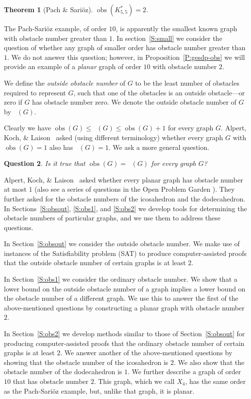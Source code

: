 \documentclass[12pt]{amsart}
\newtheorem{theorem}{Theorem}[section]
\newtheorem{question}[theorem]{Question}
\theoremstyle{remark}
\DeclareMathOperator{\obs}{\ensuremath{\mathrm{obs}}}
\DeclareMathOperator{\obsout}{\ensuremath{\obs_\mathrm{out}}}
\begin{document}
\begin{theorem}[Pach \& Sari\"{o}z] \label{T:kstar55}
$\obs(K^*_{5,5}) = 2$.
\end{theorem}
The Pach-Sari\"{o}z example, of order $10$,
is apparently the smallest known graph with obstacle number greater than $1$.
In section~\ref{S:small} we consider
the question of whether any graph of smaller order
has obstacle number greater than $1$.
We do not answer this question;
however, in Proposition~\ref{P:gesdp-obs} we will provide
an example of a \emph{planar} graph of order $10$ with obstacle number $2$.

We define the \emph{outside obstacle number} of $G$
to be the least number of obstacles required to represent $G$,
such that one of the obstacles is an outside obstacle---or
zero if $G$ has obstacle number zero.
We denote the outside obstacle number of $G$ by
$\obsout(G)$.

Clearly we have
$\obs(G)\le \obsout(G)\le \obs(G)+1$
for every graph $G$.
Alpert, Koch, \& Laison~\cite[p.~229]{AlpKocLai10}
asked (using different terminology) whether
every graph $G$ with
$\obs(G) = 1$
also has
$\obsout(G) = 1$.
We ask a more general question.

\begin{question}
Is it true that
$\obs(G) = \obsout(G)$
for every graph $G$?\end{question}

Alpert, Koch, \& Laison~\cite[p.~231]{AlpKocLai10}
asked whether every planar graph has obstacle number at most $1$
(also see a series of questions in the Open Problem Garden \cite{Gar}).
They further asked for the obstacle numbers of
the icosahedron and the dodecahedron.
In Sections~\ref{S:obsout}, \ref{S:obs1}, and \ref{S:obs2}
we develop tools for determining the obstacle numbers of
particular graphs,
and we use them to address these questions.

In Section~\ref{S:obsout} we consider the outside obstacle number.
We make use of instances of the Satisfiability problem (SAT)
to produce computer-assisted proofs that
the outside obstacle number of certain graphs is at least $2$.

In Section~\ref{S:obs1} we consider the ordinary obstacle number.
We show that a lower bound on the outside obstacle number of a graph
implies a lower bound on the obstacle number of a different graph.
We use this to answer the first of the above-mentioned questions
by constructing a planar graph with obstacle number $2$.

In Section~\ref{S:obs2} we develop methods similar to
those of Section~\ref{S:obsout}
for producing computer-assisted proofs that the ordinary
obstacle number of certain graphs is at least $2$.
We answer another of the above-mentioned questions by showing
that the obstacle number of the icosahedron is $2$.
We also show that the obstacle number of the dodecahedron is
$1$.
We further describe a graph of order $10$
that has obstacle number $2$.
This graph, which we call $X_4$, has the same order as the
Pach-Sari\"{o}z example,
but, unlike that graph,
it is planar.
\end{document}
